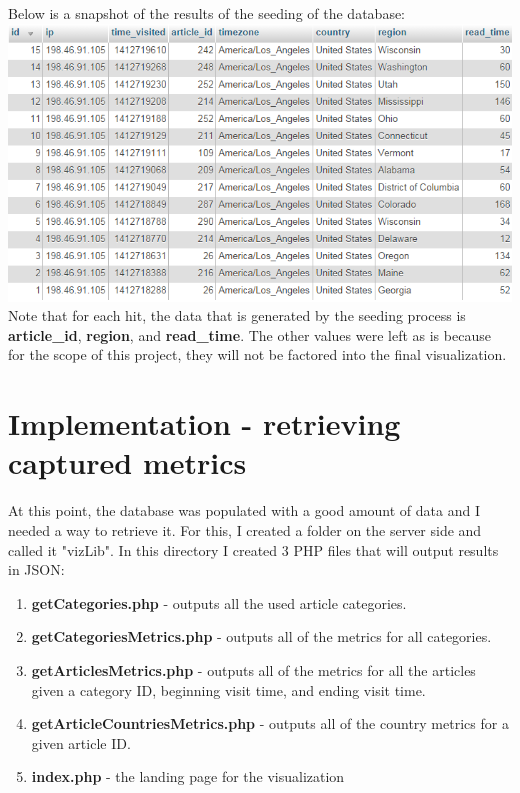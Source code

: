 \documentclass[12pt]{article}
\begin{document}
\noindent Below is a snapshot of the results of the seeding of the database: \\

\noindent\includegraphics[scale=0.8]{img/seeder_mock_hits} \\

\noindent Note that for each hit, the data that is generated by the seeding process is \textbf{article\_id}, \textbf{region}, and \textbf{read\_time}. The other values were left as is because for the scope of this project, they will not be factored into the final visualization. 

\vfill

\section{Implementation - retrieving captured metrics}
At this point, the database was populated with a good amount of data and I needed a way to retrieve it. For this, I created a folder on the server side and called it "vizLib". In this directory I created 3 PHP files that will output results in JSON:
\begin{enumerate}
\item{\textbf{getCategories.php} - outputs all the used article categories.}

\item{\textbf{getCategoriesMetrics.php} - outputs all of the metrics for all categories.}

\item{\textbf{getArticlesMetrics.php} - outputs all of the metrics for all the articles given a category ID, beginning visit time, and ending visit time.}

\item{\textbf{getArticleCountriesMetrics.php} - outputs all of the country metrics for a given article ID.}

\item{\textbf{index.php} - the landing page for the visualization}

\end{enumerate}
\end{document}

